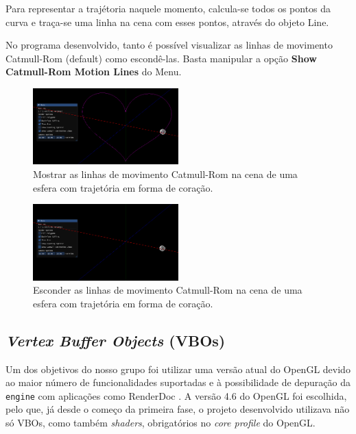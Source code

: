 \documentclass[12pt, a4paper]{article}
\begin{document}
Para representar a trajétoria naquele momento, calcula-se todos os pontos da curva e
traça-se uma linha na cena com esses pontos, através do objeto Line.

No programa desenvolvido, tanto é possível visualizar as linhas de movimento Catmull-Rom (default)
como escondê-las. Basta manipular a opção \textbf{Show Catmull-Rom Motion Lines} do Menu.

\begin{figure}[H]
    \centering
    \includegraphics[width=0.5\textwidth]{res/phase3/ShowCatmullRomMotionLines.png}
    \caption{Mostrar as linhas de movimento Catmull-Rom na cena de
    uma esfera com trajetória em forma de coração.}
\end{figure}

\begin{figure}[H]
    \centering
    \includegraphics[width=0.5\textwidth]{res/phase3/HideCatmullRomMotionLines.png}
    \caption{Esconder as linhas de movimento Catmull-Rom na cena de
    uma esfera com trajetória em forma de coração.}
\end{figure}

\subsection{\emph{Vertex Buffer Objects} (VBOs)}

Um dos objetivos do nosso grupo foi utilizar uma versão atual do OpenGL devido ao maior número de
funcionalidades suportadas e à possibilidade de depuração da \texttt{engine} com aplicações como
RenderDoc \cite{renderdoc}. A versão 4.6 do OpenGL foi escolhida, pelo que, já desde o começo da
primeira fase, o projeto desenvolvido utilizava não só VBOs, como também \emph{shaders},
obrigatórios no \emph{core profile} do OpenGL.
\end{document}
